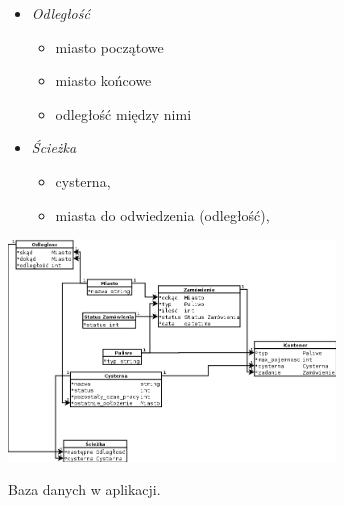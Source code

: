 \documentclass[11pt,a4paper,oneside]{mwart}
\begin{document}
\begin{itemize}
\begin{itemize}
    \end{itemize}
    \item \emph{Odległość} %
    \begin{itemize}
      \item miasto początowe
      \item miasto końcowe
      \item odległość między nimi
    \end{itemize}
    \item \emph{Ścieżka}  
    \begin{itemize}
      \item cysterna,
      \item miasta do odwiedzenia (odległość),
    \end{itemize}
\end{itemize}

\begin{schemat}
  \centering
  \includegraphics[width=0.65\textwidth]{pics/baza.png}
  \caption{Baza danych w aplikacji.}
  \label{fig:baza}
\end{schemat}

\end{document}
